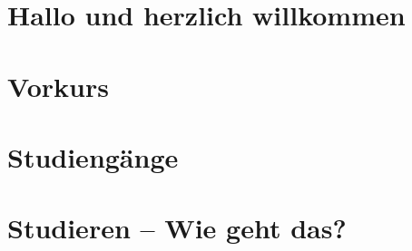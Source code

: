 \documentclass[ngerman,a4paper,openany,twocolumn,showtrims]{memoir}
\begin{document}
\pagestyle{empty}


\frontmatter
\tableofcontents

\mainmatter{}
\pagestyle{plain}
\renewcommand*{\chaptermark}[1]{%
    \markboth{%
        \textcolor{sectiontextfarbe}{%
            \sffamily\bfseries\textsc{#1}%
        }%
    }{}%
}
\renewcommand*{\sectionmark}[1]{%
    \markright{%
        \textcolor{sectiontextfarbe}{%
            \sffamily\bfseries\textsc{#1}%
        }%
    }%
}

\chapter{Hallo und herzlich willkommen}


\chapter{Vorkurs}





\chapter{Studiengänge}












\chapter{Studieren -- Wie geht das?}












\end{document}
